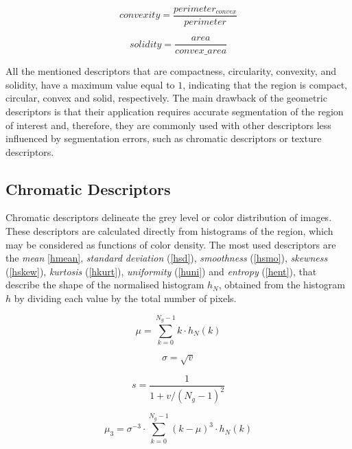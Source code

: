 \documentclass[final,a4paper,12pt,english]{UnicaPhdThesis3}
\begin{document}
\begin{equation}\label{convexity}
convexity=\frac{perimeter_{convex}}{perimeter}
\end{equation}

\begin{equation}\label{solidity}
solidity=\frac{area}{convex\_area}
\end{equation}

All the mentioned descriptors that are compactness, circularity, convexity, and solidity, have a maximum value equal to $1$, indicating that the region is compact, circular, convex and solid, respectively.  The main drawback of the geometric descriptors is that their application requires accurate segmentation of the region of interest and, therefore, they are commonly used with other descriptors less influenced by segmentation errors, such as chromatic descriptors or texture descriptors.

\subsection{Chromatic Descriptors} %
Chromatic descriptors delineate the grey level or color distribution of images. These descriptors are calculated directly from histograms of the region, which may be considered as functions of color density. The most used descriptors are the \textit{mean} \ref{hmean},  \textit{standard deviation} (\ref{hsd}), \textit{smoothness} (\ref{hsmo}), \textit{skewness} (\ref{hskew}), \textit{kurtosis} (\ref{hkurt}), \textit{uniformity} (\ref{huni}) and \textit{entropy} (\ref{hent}), that describe the shape of the normalised histogram $h_N$, obtained from the histogram $h$ by dividing each value by the total number of pixels.

\begin{equation}\label{hmean}
\mu=\sum_{k=0}^{N_{g}-1} k\cdot h_N(k)
\end{equation}

\begin{equation}\label{hsd}
\sigma=\sqrt{v}
\end{equation}

\begin{equation}\label{hsmo}
s=\frac{1}{1 + v/(N_{g}-1)^2 }
\end{equation}

\begin{equation}\label{hskew}
\mu_3=\sigma^{-3} \cdot \sum_{k=0}^{N_{g}-1} (k - \mu)^3 \cdot h_N(k)
\end{equation}
\end{document}
